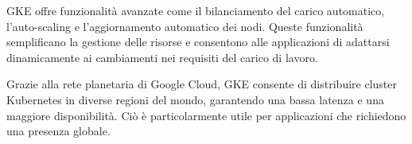GKE offre funzionalità avanzate come il bilanciamento del carico automatico, l'auto-scaling e l'aggiornamento automatico dei nodi. Queste funzionalità semplificano la gestione delle risorse e consentono alle applicazioni di adattarsi dinamicamente ai cambiamenti nei requisiti del carico di lavoro.

Grazie alla rete planetaria di Google Cloud, GKE consente di distribuire cluster Kubernetes in diverse regioni del mondo, garantendo una bassa latenza e una maggiore disponibilità. Ciò è particolarmente utile per applicazioni che richiedono una presenza globale.
